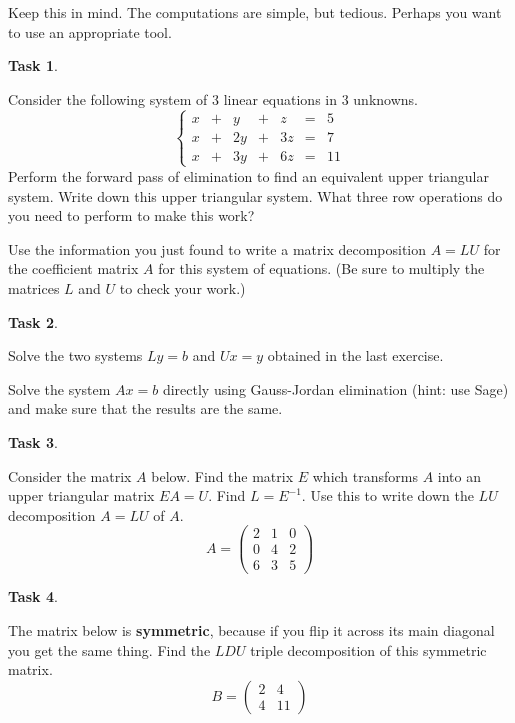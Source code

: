 \documentclass[10pt,]{book}
\newcommand{\terminology}[1]{\textbf{#1}}
\theoremstyle{plain}
\theoremstyle{definition}
\numberwithin{equation}{section}
\newtheorem{task}{Task}[chapter]
\begin{document}
    Keep this in mind. The computations are simple, but tedious.
    Perhaps you want to use an appropriate tool.
\begin{task}
\label{task-69}

        Consider the following system of 3 linear equations in 3 unknowns.
        \[\left\{
        \begin{array}{rrrrrrr}
        x & + & y & + & z & = & 5 \\
        x & + & 2y & + & 3z & = & 7 \\
        x & + & 3y & + & 6z & = & 11
        \end{array}\right.
        \]
        Perform the forward pass of elimination to find an equivalent upper
        triangular system. Write down this upper triangular system. What three
        row operations do you need to perform to make this work?
\par

        Use the information you just found to write a matrix
        decomposition \(A = LU\) for the coefficient matrix \(A\) for this
        system of equations. (Be sure to multiply the matrices \(L\) and \(U\)
        to check your work.)
\end{task}
\begin{task}
\label{task-70}

        Solve the two systems \(Ly = b\) and \(Ux=y\) obtained in the last
        exercise.
\par

        Solve the system \(Ax=b\) directly using Gauss-Jordan
        elimination (hint: use Sage) and make sure that the results
        are the same.
\end{task}
\begin{task}
\label{task-71}

      Consider the matrix \(A\) below. Find the matrix \(E\) which
      transforms \(A\) into an upper triangular matrix \(EA = U\).
      Find \(L = E^{-1}\). Use this to write down the \(LU\) decomposition
      \(A= LU\) of \(A\).
      \[
        A =
        \begin{pmatrix}
        2 & 1 & 0 \\
        0 & 4 & 2 \\
        6 & 3 & 5
        \end{pmatrix}
      \]\end{task}
\begin{task}
\label{task-72}

      The matrix below is \terminology{symmetric}, because if you flip it across
      its main diagonal you get the same thing. Find the \(LDU\) triple
      decomposition of this symmetric matrix.
      \[
        B =
        \begin{pmatrix}
        2 & 4 \\
        4 & 11
        \end{pmatrix}
      \]\end{task}
\end{document}

